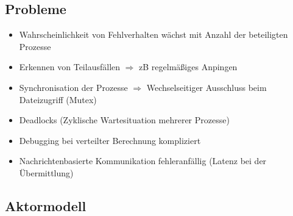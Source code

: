 \documentclass{scrartcl}
\begin{document}

\subsection{Probleme} \label{prob}

\begin{itemize}
\item Wahrscheinlichkeit von Fehlverhalten wächst mit Anzahl der beteiligten Prozesse
\item Erkennen von Teilausfällen $\Rightarrow$ zB regelmäßiges Anpingen
\item Synchronisation der Prozesse $\Rightarrow$ Wechselseitiger Ausschluss beim Dateizugriff (Mutex)
\item Deadlocks (Zyklische Wartesituation mehrerer Prozesse)
\item Debugging bei verteilter Berechnung kompliziert
\item Nachrichtenbasierte Kommunikation fehleranfällig (Latenz bei der Übermittlung)
\end{itemize}




\subsection{Aktormodell} \label{aktm}
\end{document}
